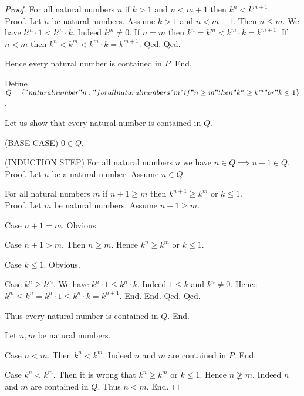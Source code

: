 \documentclass[../../natural-numbers.ftl.tex]{subfiles}
\begin{document}
\begin{forthel}
\begin{proof}
          For all natural numbers $n$ if $k > 1$ and $n < m + 1$ then $k^{n} < k^{m + 1}$. \\
          Proof.
            Let $n$ be natural numbers.
            Assume $k > 1$ and $n < m + 1$.
            Then $n \leq m$.
            We have $k^{m} \cdot 1 < k^{m} \cdot k$.
            Indeed $k^{m} \neq 0$.
            If $n = m$ then $k^{n} = k^{m} < k^{m} \cdot k = k^{m + 1}$.
            If $n < m$ then $k^{n} < k^{m} < k^{m} \cdot k = k^{m + 1}$.
          Qed.
        Qed.

        Hence every natural number is contained in $P$.
      End.


      Define $Q = \{ "natural number" n : " for all natural numbers" m "if" n \geq m "then" k^{n} \geq k^{m} "or" k \leq 1 \}$.

      Let us show that every natural number is contained in $Q$.

        (BASE CASE) $0 \in Q$.

        (INDUCTION STEP) For all natural numbers $n$ we have $n \in Q \implies n + 1 \in Q$. \\
        Proof.
          Let $n$ be a natural number.
          Assume $n \in Q$.

          For all natural numbers $m$ if $n + 1 \geq m$ then $k^{n + 1} \geq k^{m}$ or $k \leq 1$. \\
          Proof.
            Let $m$ be natural numbers.
            Assume $n + 1 \geq m$.

            Case $n + 1 = m$. Obvious.

            Case $n + 1 > m$.
              Then $n \geq m$.
              Hence $k^{n} \geq k^{m}$ or $k \leq 1$.

              Case $k \leq 1$. Obvious.

              Case $k^{n} \geq k^{m}$.
                We have $k^{n} \cdot 1 \leq k^{n} \cdot k$.
                Indeed $1 \leq k$ and $k^{n} \neq 0$.
                Hence $k^{m} \leq k^{n} = k^{n} \cdot 1 \leq k^{n} \cdot k = k^{n + 1}$.
              End.
            End.
          Qed.
        Qed.

        Thus every natural number is contained in $Q$.
      End.


      Let $n,m$ be natural numbers.

      Case $n < m$.
        Then $k^{n} < k^{m}$.
        Indeed $n$ and $m$ are contained in $P$.
      End.

      Case $k^{n} < k^{m}$.
        Then it is wrong that $k^{n} \geq k^{m}$ or $k \leq 1$.
        Hence $n \ngeq m$.
        Indeed $n$ and $m$ are contained in $Q$.
        Thus $n < m$.
      End.
    \end{proof}



\end{forthel}
\end{document}
